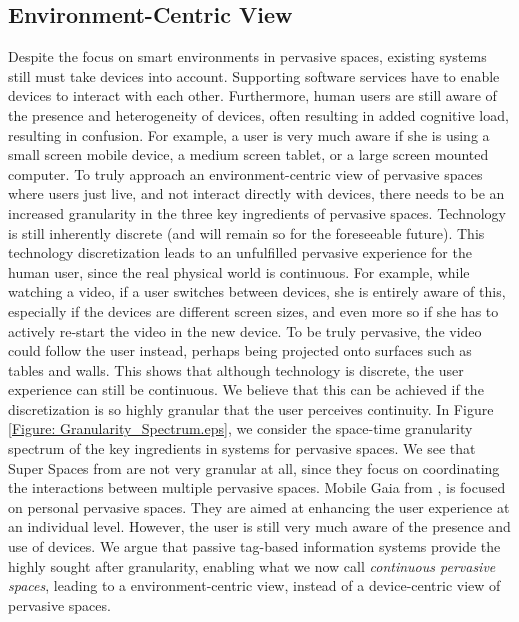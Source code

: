 \subsection{Environment-Centric View}
Despite the focus on smart environments in pervasive spaces, existing systems still must take devices into account. Supporting software services have to enable devices to interact with each other. Furthermore, human users are still aware of the presence and heterogeneity of devices, often resulting in added cognitive load, resulting in confusion. For example, a user is very much aware if she is using a small screen mobile device, a medium screen tablet, or a large screen mounted computer. To truly approach an environment-centric view of pervasive spaces where users just live, and not interact directly with devices, there needs to be an increased granularity in the three key ingredients of pervasive spaces. Technology is still inherently discrete (and will remain so for the foreseeable future). This technology discretization leads to an unfulfilled pervasive experience for the human user, since the real physical world is continuous. For example, while watching a video, if a user switches between devices, she is entirely aware of this, especially if the devices are different screen sizes, and even more so if she has to actively re-start the video in the new device. To be truly pervasive, the video could follow the user instead, perhaps being projected onto surfaces such as tables and walls. This shows that although technology is discrete, the user experience can still be continuous. We believe that this can be achieved if the discretization is so highly granular that the user perceives continuity. In Figure \ref{Figure: Granularity_Spectrum.eps}, we consider the space-time granularity spectrum of the key ingredients in systems for pervasive spaces. We see that Super Spaces from \cite{2004 Al-Muhtadi} are not very granular at all, since they focus on coordinating the interactions between multiple pervasive spaces. Mobile Gaia from  \cite{2004 Shankar}, \cite{2005 Chetan} is focused on personal pervasive spaces. They are aimed at enhancing the user experience at an individual level. However, the user is still very much aware of the presence and use of devices. We argue that passive tag-based information systems provide the highly sought after granularity, enabling what we now call \emph{continuous pervasive spaces}, leading to a environment-centric view, instead of a device-centric view of pervasive spaces.

